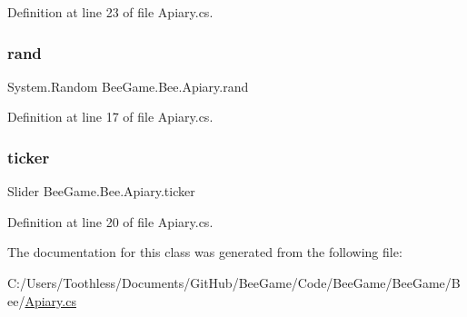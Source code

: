 Definition at line 23 of file Apiary.\+cs.

\mbox{\label{class_bee_game_1_1_bee_1_1_apiary_a272ac8b385ad3a7cd358b0959d561be7}} 
\subsubsection{\texorpdfstring{rand}{rand}}
{\footnotesize\ttfamily System.\+Random Bee\+Game.\+Bee.\+Apiary.\+rand\hspace{0.3cm}{\ttfamily [private]}}



Definition at line 17 of file Apiary.\+cs.

\mbox{\label{class_bee_game_1_1_bee_1_1_apiary_a7af4d39f709090d5e5f0c8877e3bbb8d}} 
\subsubsection{\texorpdfstring{ticker}{ticker}}
{\footnotesize\ttfamily Slider Bee\+Game.\+Bee.\+Apiary.\+ticker}



Definition at line 20 of file Apiary.\+cs.



The documentation for this class was generated from the following file\+:\begin{DoxyCompactItemize}
\item 
C\+:/\+Users/\+Toothless/\+Documents/\+Git\+Hub/\+Bee\+Game/\+Code/\+Bee\+Game/\+Bee\+Game/\+Bee/\hyperlink{_apiary_8cs}{Apiary.\+cs}\end{DoxyCompactItemize}
